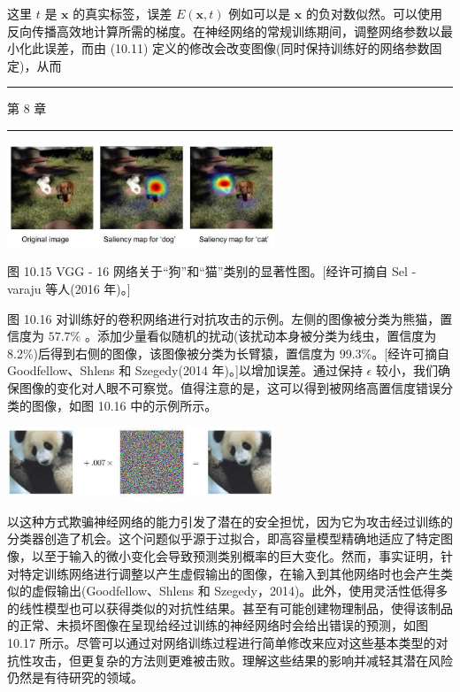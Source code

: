 \documentclass[10pt]{report}
\newcommand{\HRule}{\begin{center}\rule{0.9\linewidth}{0.2mm}\end{center}}
\begin{document}
这里 \(t\) 是 \(\mathbf{x}\) 的真实标签，误差 \(E\left( {\mathbf{x},t}\right)\) 例如可以是 \(\mathbf{x}\) 的负对数似然。可以使用反向传播高效地计算所需的梯度。在神经网络的常规训练期间，调整网络参数以最小化此误差，而由 (10.11) 定义的修改会改变图像(同时保持训练好的网络参数固定)，从而

\HRule

第 8 章

\HRule

\begin{center}
\includegraphics[max width=0.6\textwidth]{images/0194e279-9b28-703a-88f4-c3ac21e2010d_325_741_1700_812_314_0.jpg}
\end{center}
\hspace*{3em} 

图 10.15 VGG - 16 网络关于“狗”和“猫”类别的显著性图。[经许可摘自 Sel - varaju 等人(2016 年)。]

图 10.16 对训练好的卷积网络进行对抗攻击的示例。左侧的图像被分类为熊猫，置信度为 \({57.7}\%\) 。添加少量看似随机的扰动(该扰动本身被分类为线虫，置信度为 8.2\%)后得到右侧的图像，该图像被分类为长臂猿，置信度为 99.3\%。[经许可摘自 Goodfellow、Shlens 和 Szegedy(2014 年)。]以增加误差。通过保持 \(\epsilon\) 较小，我们确保图像的变化对人眼不可察觉。值得注意的是，这可以得到被网络高置信度错误分类的图像，如图 10.16 中的示例所示。

\begin{center}
\includegraphics[max width=0.6\textwidth]{images/0194e279-9b28-703a-88f4-c3ac21e2010d_326_677_397_862_225_0.jpg}
\end{center}
\hspace*{3em} 

以这种方式欺骗神经网络的能力引发了潜在的安全担忧，因为它为攻击经过训练的分类器创造了机会。这个问题似乎源于过拟合，即高容量模型精确地适应了特定图像，以至于输入的微小变化会导致预测类别概率的巨大变化。然而，事实证明，针对特定训练网络进行调整以产生虚假输出的图像，在输入到其他网络时也会产生类似的虚假输出(Goodfellow、Shlens 和 Szegedy，2014)。此外，使用灵活性低得多的线性模型也可以获得类似的对抗性结果。甚至有可能创建物理制品，使得该制品的正常、未损坏图像在呈现给经过训练的神经网络时会给出错误的预测，如图 10.17 所示。尽管可以通过对网络训练过程进行简单修改来应对这些基本类型的对抗性攻击，但更复杂的方法则更难被击败。理解这些结果的影响并减轻其潜在风险仍然是有待研究的领域。
\end{document}

